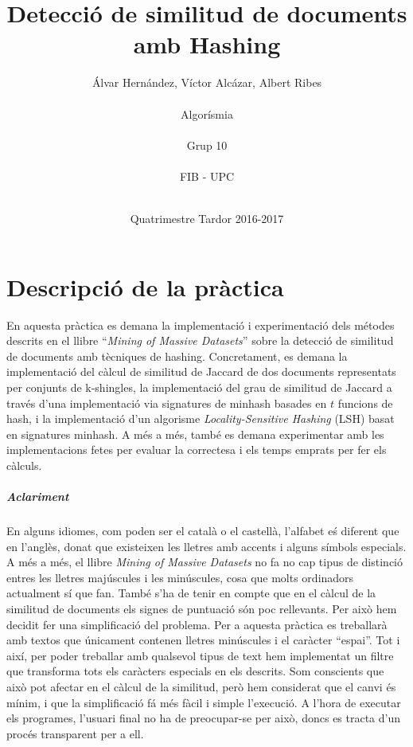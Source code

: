 \documentclass[a4paper, titlepage, 12pt]{report}
\begin{document}
\title{Detecció de similitud de documents amb Hashing}
\author{
Álvar Hernández, Víctor Alcázar, Albert Ribes \\\\
Algorísmia \\\\
Grup 10 \\\\
FIB - UPC \\\\
}
\date{Quatrimestre Tardor 2016-2017}



\maketitle
\tableofcontents

\chapter{Descripció de la pràctica}
En aquesta pràctica es demana la implementació i experimentació dels métodes descrits en el llibre ``\textit{Mining of Massive Datasets}'' \cite{minigDatasets} sobre la detecció de similitud de documents amb tècniques de hashing. Concretament, es demana la implementació del càlcul de similitud de Jaccard de dos documents representats per conjunts de k-shingles, la implementació del grau de similitud de Jaccard a través d'una implementació via signatures de minhash basades en $t$ funcions de hash, i la implementació d'un algorisme \textit{Locality-Sensitive Hashing} (LSH) basat en signatures minhash. A més a més, també es demana experimentar amb les implementacions fetes per evaluar la correctesa i els temps emprats per fer els càlculs.

\paragraph{Aclariment}
En alguns idiomes, com poden ser el català o el castellà, l'alfabet eś diferent que en l'anglès, donat que existeixen les lletres amb accents i alguns símbols especials. A més a més, el llibre \textit{Mining of Massive Datasets} \cite{minigDatasets} no fa no cap tipus de distinció entres les lletres majúscules i les minúscules, cosa que molts ordinadors actualment sí que fan. També s'ha de tenir en compte que en el càlcul de la similitud de documents els signes de puntuació són poc rellevants. Per això hem decidit fer una simplificació del problema. Per a aquesta pràctica es treballarà amb textos que únicament contenen lletres minúscules i el caràcter ``espai''. Tot i així, per poder treballar amb qualsevol tipus de text hem implementat un filtre que transforma tots els caràcters especials en els descrits. Som conscients que això pot afectar en el càlcul de la similitud, però hem considerat que el canvi és mínim, i que la simplificació fá més fàcil i simple l'execució. A l'hora de executar els programes, l'usuari final no ha de preocupar-se per això, doncs es tracta d'un procés transparent per a ell.
\end{document}
